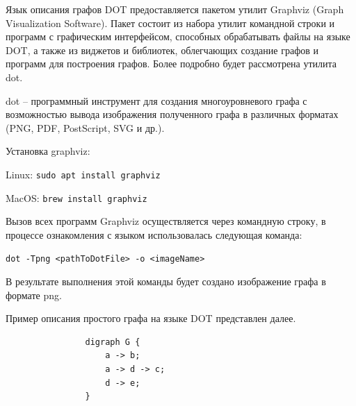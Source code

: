 \def\notedate{2021.10.05}
\def\currentauthor{Ершов В. (РК6-72Б)}

Язык описания графов DOT предоставляется пакетом утилит Graphviz (Graph Visualization Software). Пакет состоит из набора утилит командной строки и программ с графическим интерфейсом, способных обрабатывать файлы на языке DOT, а также из виджетов и библиотек, облегчающих создание графов и программ для построения графов. Более подробно будет рассмотрена утилита dot.

\begin{remark}
dot -- программный инструмент для создания многоуровневого графа с возможностью вывода изображения полученного графа в различных форматах (PNG, PDF, PostScript, SVG и др.).
\end{remark}

Установка graphviz:

\quad Linux: \lstinline$sudo apt install graphviz$

\quad MacOS: \lstinline$brew install graphviz$


Вызов всех программ Graphviz осуществляется через командную строку, в процессе ознакомления с языком использовалась следующая команда:

\quad\lstinline$dot -Tpng <pathToDotFile> -o <imageName>$

В результате выполнения этой команды будет создано изображение графа в формате png.

Пример описания простого графа на языке DOT представлен далее.

\begin{minipage}{0.2\textwidth}
		\begin{verbatim}
				digraph G {
				    a -> b;
				    a -> d -> c;
				    d -> e;
				}
		\end{verbatim}
	\end{minipage}
	\hfill
	\begin{minipage}{0.75\textwidth}
	\end{minipage}

